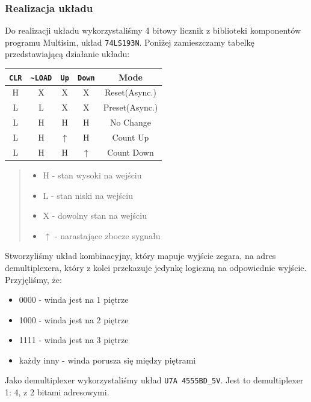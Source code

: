 \documentclass[a4paper]{article}
\begin{document}
\subsubsection{Realizacja układu}
Do realizacji układu wykorzystaliśmy 4 bitowy licznik z biblioteki komponentów programu Multisim,
układ \verb|74LS193N|. Poniżej zamieszczamy tabelkę przedstawiającą działanie układu:
\begin{center}
    \begin{tabular}{|c|c|c|c||c|}
        \hline \verb|CLR| & \verb|~LOAD| & \verb|Up| & \verb|Down| & Mode \\
        \hline H & X & X & X & Reset(Async.) \\
        \hline L & L & X & X & Preset(Async.) \\
        \hline L & H & H & H & No Change \\
        \hline L & H & $\uparrow$ & H & Count Up \\
        \hline L & H & H & $\uparrow$ & Count Down \\
        \hline
    \end{tabular}
\end{center}
\begin{abstract}
    \begin{itemize}
        \item H - stan wysoki na wejściu
        \item L - stan niski na wejściu
        \item X - dowolny stan na wejściu
        \item $\uparrow$ - narastające zbocze sygnału
    \end{itemize}
\end{abstract}
Stworzyliśmy układ kombinacyjny, który mapuje wyjście zegara, na adres demultiplexera, który 
z kolei przekazuje jedynkę logiczną na odpowiednie wyjście. 
Przyjęliśmy, że:
\begin{itemize}
    \item 0000 - winda jest na 1 piętrze
    \item 1000 - winda jest na 2 piętrze
    \item 1111 - winda jest na 3 piętrze
    \item każdy inny - winda porusza się między piętrami
\end{itemize}
Jako demultiplexer wykorzystaliśmy układ \verb|U7A 4555BD_5V|. Jest to demultiplexer 1: 4, z 2 
bitami adresowymi.
\end{document}
